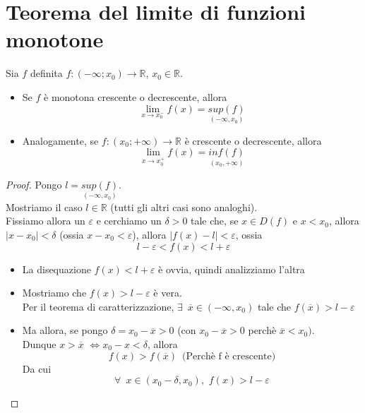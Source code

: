\documentclass{article}
\theoremstyle{definition}
\begin{document}
\section{Teorema del limite di  funzioni monotone}
Sia $f$ definita $f:(-\infty;x_0) \to \mathbb{R}$, $x_0 \in \mathbb{R}$.
\begin{itemize}
    \item Se $f$ è monotona crescente o decrescente, allora
    \begin{equation}
        \lim_{x\to x_0^-}f(x)=\underset{(-\infty, x_0)   }{sup(f)}    
    \end{equation}
    \item Analogamente, se $f: (x_0;+\infty) \to \mathbb{R}$ è crescente o decrescente, allora
    \begin{equation}
     \lim_{x\to x_0^+}f(x)=\underset{(x_0, +\infty)}{inf(f)} 
        \end{equation}

    \end{itemize}
\begin{proof}
    Pongo $l=\underset{(-\infty,x_0)}{sup(f)} $.
    \\
    Mostriamo il caso $l \in \mathbb{R}$ (tutti gli altri casi sono analoghi).
    \\
    Fissiamo allora un $\varepsilon$ e cerchiamo un $\delta >0$ tale che, se $x \in D(f)$ e $x<x_0$, allora $|x-x_0|<\delta$ (ossia $x-x_0 < \varepsilon$), allora $|f(x)-l|<\varepsilon$, ossia
    \begin{equation}
        l-\varepsilon<f(x)<l+\varepsilon
    \end{equation}
    \begin{itemize}
        \item La disequazione $f(x)<l+\varepsilon$ è ovvia, quindi analizziamo l'altra
        \item Mostriamo che $f(x)>l-\varepsilon$ è vera.
        \\
        Per il teorema di caratterizzazione, $\exists \,\,\, \overline{x} \in (-\infty,x_0)$ tale che $f(\overline{x})>l-\varepsilon$
        \item Ma allora, se pongo $\delta=x_0-\overline{x}>0$ (con $x_0-\overline{x}>0$ perchè $\overline{x}<x_0)$.
        \\
        Dunque $x>\overline{x}$ $\Longleftrightarrow x_0-x<\delta$, allora
        \begin{equation}
            f(x)>f(\overline{x}) \,\,\, \mbox{(Perchè f è crescente)}
        \end{equation}
        Da cui
        \\
        \begin{equation}
            \forall \,\,\, x \in (x_0-\delta,x_0), \,\, f(x)> l- \varepsilon
        \end{equation}
    \end{itemize}
\end{proof}
\end{document}
